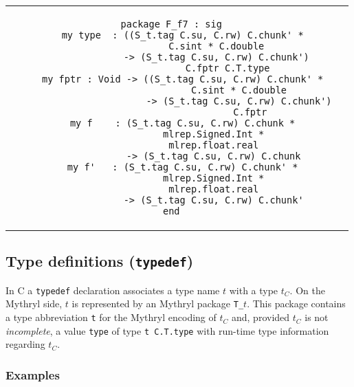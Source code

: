 \begin{small}
\begin{center}
\begin{tabular}{c|c}
\begin{minipage}{4in}
\begin{verbatim}
package F_f7 : sig
    my type  : ((S_t.tag C.su, C.rw) C.chunk' *
                C.sint * C.double
                -> (S_t.tag C.su, C.rw) C.chunk')
                    C.fptr C.T.type
    my fptr : Void -> ((S_t.tag C.su, C.rw) C.chunk' *
                        C.sint * C.double
                        -> (S_t.tag C.su, C.rw) C.chunk')
                            C.fptr
    my f    : (S_t.tag C.su, C.rw) C.chunk *
               mlrep.Signed.Int *
               mlrep.float.real
               -> (S_t.tag C.su, C.rw) C.chunk
    my f'   : (S_t.tag C.su, C.rw) C.chunk' *
               mlrep.Signed.Int *
               mlrep.float.real
               -> (S_t.tag C.su, C.rw) C.chunk'
end

\end{verbatim}
\end{minipage}
\end{tabular}
\end{center}
\end{small}

\subsection{Type definitions ({\tt typedef})}

In C a {\tt typedef} declaration associates a type name $t$ with a
type $t_C$.  On the Mythryl side, $t$ is represented by an Mythryl package
{\tt T\_$t$}.  This package contains a type abbreviation {\tt t} for
the Mythryl encoding of $t_C$ and, provided $t_C$ is not {\em incomplete},
a value {\tt type} of type {\tt t C.T.type} with run-time type
information regarding $t_C$.

\subsubsection*{Examples}

